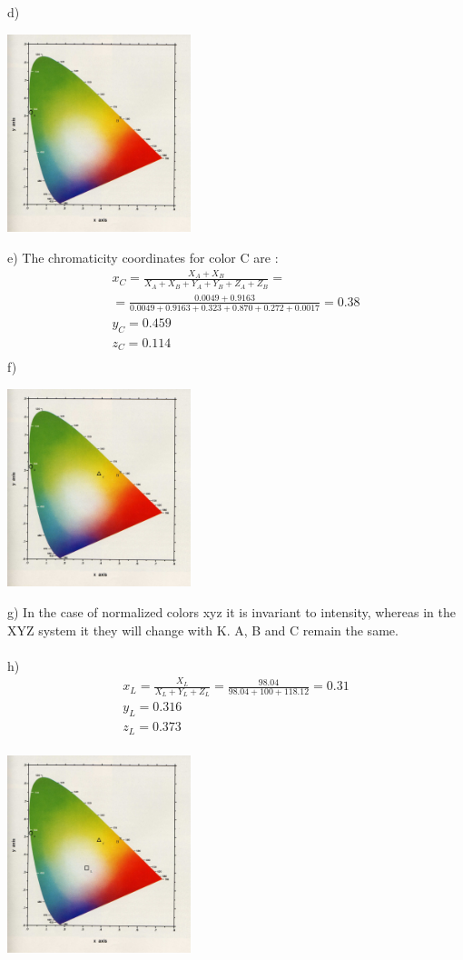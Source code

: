 \documentclass{article}
\begin{document}
d)
\begin{center}
\includegraphics[width=0.4\textwidth]{2d.jpg} 
\end{center}
e) The chromaticity coordinates for color C are :
\begin{gather} 
x_{C} = \frac{X_{A}+X_{B}}{X_{A}+X_{B}+Y_{A}+Y_{B}+Z_{A}+Z_{B}} = \\ = \frac{0.0049+0.9163}{0.0049+0.9163 + 0.323 + 0.870 + 0.272 + 0.0017 } = 0.38 \\
y_{C} = 0.459	\\
z_{C} = 0.114	\\
\end{gather}
f)
\begin{center}
\includegraphics[width=0.4\textwidth]{2f.jpg} 
\end{center}
g) In the case of normalized colors xyz it is invariant to intensity, whereas in the XYZ system it they will change with K. A, B and C remain the same. \\\\
h) 
\begin{gather}  
x_{L} = \frac{X_{L}}{X_{L}+Y_{L}+Z_{L}} = \frac{98.04}{98.04+100+118.12} = 0.31 \\
y_{L} = 0.316 \\
z_{L} = 0.373 \\
\end{gather}
\begin{center}
\includegraphics[width=0.4\textwidth]{2h.jpg}
\end{center}
\end{document}
